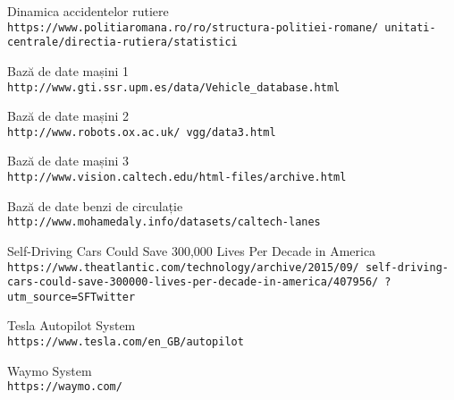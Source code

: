 \begin{thebibliography}{9}
	Dinamica accidentelor rutiere
	\\\texttt{https://www.politiaromana.ro/ro/structura-politiei-romane/
		unitati-centrale/directia-rutiera/statistici}
	
	Bază de date mașini 1
	\\\texttt{http://www.gti.ssr.upm.es/data/Vehicle\_database.html}
	
	Bază de date mașini 2
	\\\texttt{http://www.robots.ox.ac.uk/~vgg/data3.html}
	
	Bază de date mașini 3
	\\\texttt{http://www.vision.caltech.edu/html-files/archive.html}
	
	Bază de date benzi de circulație
	\\\texttt{http://www.mohamedaly.info/datasets/caltech-lanes}
	
	Self-Driving Cars Could Save 300,000 Lives Per Decade in America
	\\\texttt{https://www.theatlantic.com/technology/archive/2015/09/
		self-driving-cars-could-save-300000-lives-per-decade-in-america/407956/
		?utm\_source=SFTwitter}
	
	Tesla Autopilot System
	\\\texttt{https://www.tesla.com/en\_GB/autopilot}
	
	Waymo System
	\\\texttt{https://waymo.com/}
	
	
\end{thebibliography}